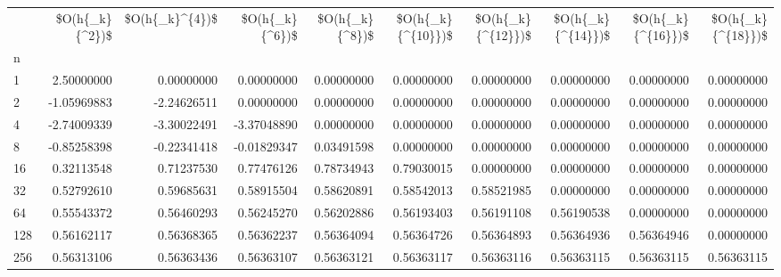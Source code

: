 \begin{tabular}{lrrrrrrrrr}
\toprule
{} &  \$O(h\{\_k\}\{\textasciicircum 2\})\$ &  \$O(h\{\_k\}\textasciicircum \{4\})\$ &  \$O(h\{\_k\}\{\textasciicircum 6\})\$ &  \$O(h\{\_k\}\{\textasciicircum 8\})\$ &  \$O(h\{\_k\}\{\textasciicircum \{10\}\})\$ &  \$O(h\{\_k\}\{\textasciicircum \{12\}\})\$ &  \$O(h\{\_k\}\{\textasciicircum \{14\}\})\$ &  \$O(h\{\_k\}\{\textasciicircum \{16\}\})\$ &  \$O(h\{\_k\}\{\textasciicircum \{18\}\})\$ \\
n   &                 &                 &                 &                 &                    &                    &                    &                    &                    \\
\midrule
1   &      2.50000000 &      0.00000000 &      0.00000000 &      0.00000000 &         0.00000000 &         0.00000000 &         0.00000000 &         0.00000000 &         0.00000000 \\
2   &     -1.05969883 &     -2.24626511 &      0.00000000 &      0.00000000 &         0.00000000 &         0.00000000 &         0.00000000 &         0.00000000 &         0.00000000 \\
4   &     -2.74009339 &     -3.30022491 &     -3.37048890 &      0.00000000 &         0.00000000 &         0.00000000 &         0.00000000 &         0.00000000 &         0.00000000 \\
8   &     -0.85258398 &     -0.22341418 &     -0.01829347 &      0.03491598 &         0.00000000 &         0.00000000 &         0.00000000 &         0.00000000 &         0.00000000 \\
16  &      0.32113548 &      0.71237530 &      0.77476126 &      0.78734943 &         0.79030015 &         0.00000000 &         0.00000000 &         0.00000000 &         0.00000000 \\
32  &      0.52792610 &      0.59685631 &      0.58915504 &      0.58620891 &         0.58542013 &         0.58521985 &         0.00000000 &         0.00000000 &         0.00000000 \\
64  &      0.55543372 &      0.56460293 &      0.56245270 &      0.56202886 &         0.56193403 &         0.56191108 &         0.56190538 &         0.00000000 &         0.00000000 \\
128 &      0.56162117 &      0.56368365 &      0.56362237 &      0.56364094 &         0.56364726 &         0.56364893 &         0.56364936 &         0.56364946 &         0.00000000 \\
256 &      0.56313106 &      0.56363436 &      0.56363107 &      0.56363121 &         0.56363117 &         0.56363116 &         0.56363115 &         0.56363115 &         0.56363115 \\
\bottomrule
\end{tabular}
